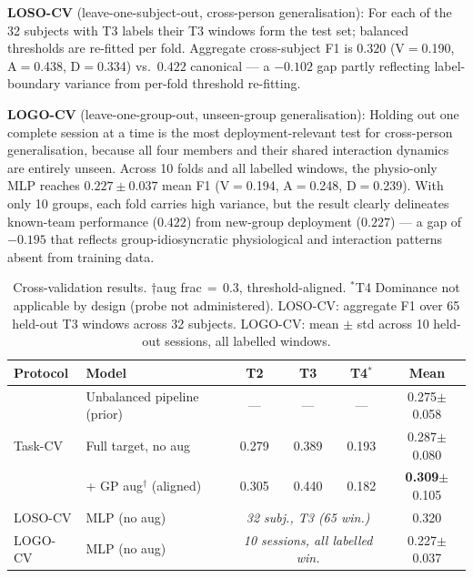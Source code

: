\documentclass[sigconf,review,anonymous]{acmart}
\begin{document}
\textbf{LOSO-CV} (leave-one-subject-out, cross-person generalisation):
For each of the 32 subjects with T3 labels their T3 windows form the test
set; balanced thresholds are re-fitted per fold.
Aggregate cross-subject F1 is $0.320$ (V$=$0.190, A$=$0.438, D$=$0.334)
vs.\ $0.422$ canonical --- a $-0.102$ gap partly reflecting label-boundary
variance from per-fold threshold re-fitting.

\textbf{LOGO-CV} (leave-one-group-out, unseen-group generalisation):
Holding out one complete session at a time is the most deployment-relevant
test for cross-person generalisation, because all four members and their
shared interaction dynamics are entirely unseen.
Across 10 folds and all labelled windows, the physio-only MLP reaches
$0.227 \pm 0.037$ mean F1 (V$=$0.194, A$=$0.248, D$=$0.239).
With only 10 groups, each fold carries high variance, but the result
clearly delineates known-team performance ($0.422$) from new-group
deployment ($0.227$) --- a gap of $-0.195$ that reflects
group-idiosyncratic physiological and interaction patterns absent from
training data.

\begin{table}[t]
\caption{Cross-validation results. $\dagger$aug frac\,$=$\,0.3, threshold-aligned.
$^*$T4 Dominance not applicable by design (probe not administered).
LOSO-CV: aggregate F1 over 65 held-out T3 windows across 32 subjects.
LOGO-CV: mean $\pm$ std across 10 held-out sessions, all labelled windows.}
\label{tab:cv}
\centering
\setlength{\tabcolsep}{4pt}
\small
\setlength{\tabcolsep}{3.5pt}
\begin{tabular}{llcccc}
\toprule
\textbf{Protocol} & \textbf{Model} &
  \textbf{T2} & \textbf{T3} & \textbf{T4}$^*$ & \textbf{Mean} \\
\midrule
\multirow{3}{*}{Task-CV}
  & Unbalanced pipeline (prior) & --- & --- & --- & 0.275$\pm$0.058 \\
  & Full target, no aug    & 0.279 & 0.389 & 0.193 & 0.287$\pm$0.080 \\
  & + GP aug$^\dagger$ (aligned) & 0.305 & 0.440 & 0.182 & \textbf{0.309}$\pm$0.105 \\
\midrule
LOSO-CV & MLP (no aug) & \multicolumn{3}{c}{\small\textit{32 subj., T3 (65 win.)}}
                                                & 0.320 \\
LOGO-CV & MLP (no aug) & \multicolumn{3}{c}{\small\textit{10 sessions, all labelled win.}}
                                                & 0.227$\pm$0.037 \\
\bottomrule
\end{tabular}
\end{table}
\end{document}

